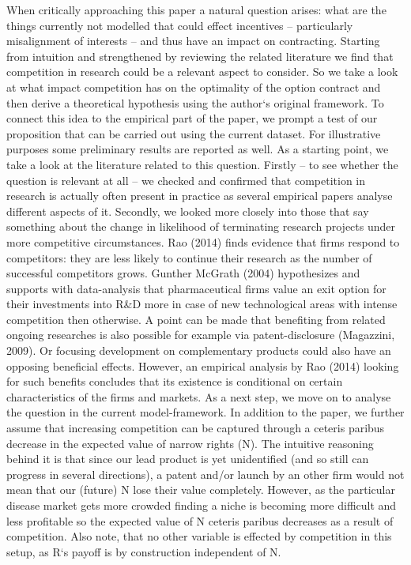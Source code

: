 When critically approaching this paper a natural question arises: what are the things currently not modelled that could effect incentives -- particularly misalignment of interests -- and thus have an impact on contracting. Starting from intuition and strengthened by reviewing the related literature we find that competition in research could be a relevant aspect to consider. So we take a look at what impact competition has on the optimality of the option contract and then derive a theoretical hypothesis using the author`s original framework. To connect this idea to the empirical part of the paper, we prompt a test of our proposition that can be carried out using the current dataset. For illustrative purposes some preliminary results are reported as well.
As a starting point, we take a look at the literature related to this question. Firstly -- to see whether the question is relevant at all -- we checked and confirmed that competition in research is actually often present in practice as several empirical papers analyse different aspects of it. Secondly, we looked more closely into those that say something about the change in likelihood of terminating research projects under more competitive circumstances. Rao (2014) finds evidence that firms respond to competitors: they are less likely to continue their research as the number of successful competitors grows.  Gunther McGrath (2004) hypothesizes and supports with data-analysis that pharmaceutical firms value an exit option for their investments into R\&D more in case of new technological areas with intense competition then otherwise. A point can be made that benefiting from related ongoing researches is also possible for example via patent-disclosure (Magazzini, 2009). Or focusing development on complementary products could also have an opposing beneficial effects. However, an empirical analysis by Rao (2014) looking for such benefits concludes that its existence is conditional on certain characteristics of the firms and markets.
As a next step, we move on to analyse the question in the current model-framework. In addition to the paper, we further assume that increasing competition can be captured through a ceteris paribus decrease in the expected value of narrow rights (N). The intuitive reasoning behind it is that since our lead product is yet unidentified (and so still can progress in several directions), a patent and/or launch by an other firm would not mean that our (future) N lose their value completely. However, as the particular disease market gets more crowded finding a niche is becoming more difficult and less profitable so the expected value of N ceteris paribus decreases as a result of competition. Also note, that no other variable is effected by competition in this setup, as R`s payoff is by construction independent of N.


